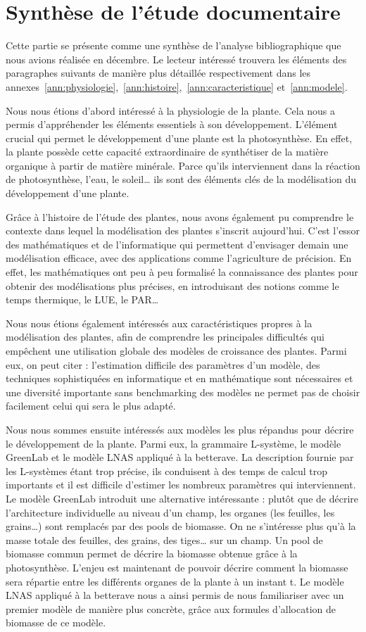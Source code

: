 \section{Synthèse de l'étude documentaire}
Cette partie se présente comme une synthèse de l’analyse bibliographique que nous avions réalisée en décembre.
Le lecteur intéressé trouvera les éléments des paragraphes suivants de manière plus détaillée respectivement dans les annexes~\ref{ann:physiologie},~\ref{ann:histoire},~\ref{ann:caracteristique}
et~\ref{ann:modele}.

Nous nous étions d’abord intéressé à la physiologie de la plante. Cela nous a permis d’appréhender les éléments essentiels à son développement.
L’élément crucial qui permet le développement d’une plante est la photosynthèse. En effet, la plante possède cette capacité extraordinaire de synthétiser de la matière organique à partir de matière minérale. 
Parce qu’ils interviennent dans la réaction de photosynthèse, l’eau, le soleil… ils sont des éléments clés de la modélisation du développement d’une plante.

 
Grâce à l’histoire de l’étude des plantes, nous avons également pu comprendre le contexte dans lequel la modélisation des plantes s’inscrit aujourd’hui. C’est l’essor des mathématiques et de l’informatique qui permettent d’envisager demain une modélisation efficace, avec des applications comme l’agriculture de précision. 
En effet, les mathématiques ont peu à peu formalisé la connaissance des plantes pour obtenir des modélisations plus précises, en introduisant des notions comme le temps thermique, le LUE, le PAR…

Nous nous étions également intéressés aux caractéristiques propres à la modélisation des plantes, afin de comprendre les principales difficultés qui empêchent une utilisation globale des modèles de croissance des plantes. Parmi eux, on peut citer : l’estimation difficile des paramètres d’un modèle, des techniques sophistiquées en informatique et en mathématique sont nécessaires et une diversité importante sans benchmarking des modèles ne permet pas de choisir facilement celui qui sera le plus adapté. 

Nous nous sommes ensuite intéressés aux modèles les plus répandus pour décrire le développement de la plante. Parmi eux, la grammaire L-système, le modèle GreenLab et le modèle LNAS appliqué à la betterave. La description fournie par les L-systèmes étant trop précise, ils conduisent à des temps de calcul trop importants et il est difficile d’estimer les nombreux paramètres qui interviennent.
Le modèle GreenLab introduit une alternative intéressante : plutôt que de décrire l’architecture individuelle au niveau d’un champ, les organes (les feuilles, les grains…) sont remplacés par des pools de biomasse. On ne s’intéresse plus qu’à la masse totale des feuilles, des grains, des tiges… sur un champ. Un pool de biomasse commun permet de décrire la biomasse obtenue grâce à la photosynthèse. L’enjeu est maintenant de pouvoir décrire comment la biomasse sera répartie entre les différents organes de la plante à un instant t. Le modèle LNAS appliqué à la betterave nous a ainsi permis de nous familiariser avec un premier modèle de manière plus concrète, grâce aux formules d’allocation de biomasse de ce modèle.
